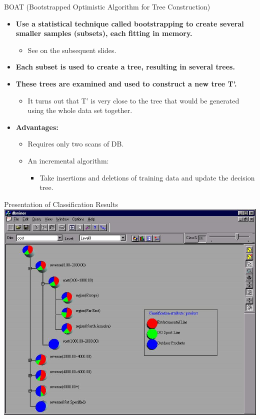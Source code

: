 \begin{frame}{BOAT (Bootstrapped Optimistic Algorithm for Tree Construction)}
	\begin{itemize}
		\item \textbf{Use a statistical technique called bootstrapping to create several smaller samples (subsets), each fitting in memory.}
		      \begin{itemize}
			      \item See on the subsequent slides.
		      \end{itemize}
		\item \textbf{Each subset is used to create a tree, resulting in several trees.}
		\item \textbf{These trees are examined and used to construct a new tree T'.}
		      \begin{itemize}
			      \item It turns out that T' is very close to the tree that would be generated \\
			            using the whole data set together.
		      \end{itemize}
		\item \textbf{Advantages:}
		      \begin{itemize}
			      \item Requires only two scans of DB.
			      \item An incremental algorithm:
			            \begin{itemize}
				            \item Take insertions and deletions of training data and update the decision tree.
			            \end{itemize}
		      \end{itemize}
	\end{itemize}
\end{frame}

\begin{frame}{Presentation of Classification Results}
	\centering
	\includegraphics[height=0.8\textheight]{img/classification1.jpeg}
\end{frame}

